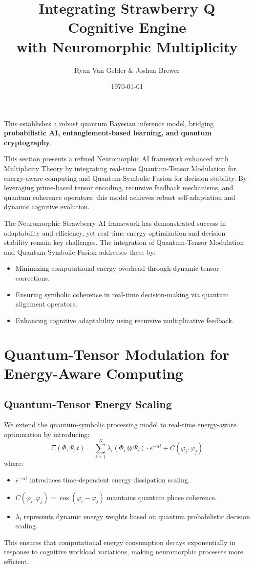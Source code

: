 \documentclass{article}
\theoremstyle{plain}
\theoremstyle{plain}
\theoremstyle{definition}
\theoremstyle{remark}
\begin{document}
This establishes a robust quantum Bayesian inference model, bridging \textbf{probabilistic AI, entanglement-based learning, and quantum cryptography}.


\title{Integrating Strawberry Q Cognitive Engine \\ with Neuromorphic Multiplicity}
\author{Ryan Van Gelder \& Joshua Brewer}
\date{\today}

This section presents a refined Neuromorphic AI framework enhanced with Multiplicity Theory by integrating real-time Quantum-Tensor Modulation for energy-aware computing and Quantum-Symbolic Fusion for decision stability. By leveraging prime-based tensor encoding, recursive feedback mechanisms, and quantum coherence operators, this model achieves robust self-adaptation and dynamic cognitive evolution.



The Neuromorphic Strawberry AI framework has demonstrated success in adaptability and efficiency, yet real-time energy optimization and decision stability remain key challenges. The integration of Quantum-Tensor Modulation and Quantum-Symbolic Fusion addresses these by:
\begin{itemize}
    \item Minimizing computational energy overhead through dynamic tensor corrections.
    \item Ensuring symbolic coherence in real-time decision-making via quantum alignment operators.
    \item Enhancing cognitive adaptability using recursive multiplicative feedback.
\end{itemize}

\section{Quantum-Tensor Modulation for Energy-Aware Computing}
\subsection{Quantum-Tensor Energy Scaling}
We extend the quantum-symbolic processing model to real-time energy-aware optimization by introducing:
\begin{equation}
    \Xi(\Phi, \Psi, t) = \sum_{i=1}^{N} \lambda_i (\Phi_i \otimes \Psi_i) \cdot e^{-\alpha t} + C(\varphi_i, \varphi_j)
\end{equation}
where:
\begin{itemize}
    \item \( e^{-\alpha t} \) introduces time-dependent energy dissipation scaling.
    \item \( C(\varphi_i, \varphi_j) = \cos(\varphi_i - \varphi_j) \) maintains quantum phase coherence.
    \item \( \lambda_i \) represents dynamic energy weights based on quantum probabilistic decision scaling.
\end{itemize}
This ensures that computational energy consumption decays exponentially in response to cognitive workload variations, making neuromorphic processes more efficient.
\end{document}
